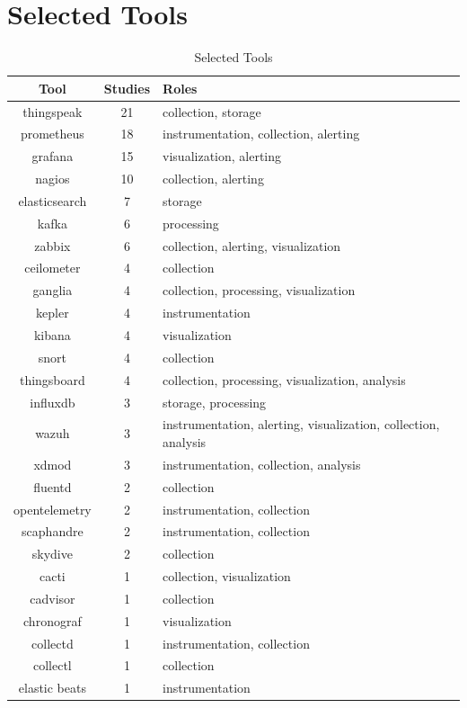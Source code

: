 \documentclass[sigconf]{acmart}
\begin{document}
\section{Selected Tools}
\begin{table}[!htbp]
  \caption{Selected Tools}
  \label{table-selected-tools}
  \small
  \begin{tabular}{c c p{4.5cm}}
  \hline
  \textbf{Tool} & \textbf{Studies} & \textbf{Roles} \\
  \hline
  thingspeak & 21 & collection, storage \\
  prometheus & 18 & instrumentation, collection, alerting \\
  grafana & 15 & visualization, alerting \\
  nagios & 10 & collection, alerting \\
  elasticsearch & 7 & storage \\
  kafka & 6 & processing \\
  zabbix & 6 & collection, alerting, visualization \\
  ceilometer & 4 & collection \\
  ganglia & 4 & collection, processing, visualization \\
  kepler & 4 & instrumentation \\
  kibana & 4 & visualization \\
  snort & 4 & collection \\
  thingsboard & 4 & collection, processing, visualization, analysis \\
  influxdb & 3 & storage, processing \\
  wazuh & 3 & instrumentation, alerting, visualization, collection,
  analysis \\
  xdmod & 3 & instrumentation, collection, analysis \\
  fluentd & 2 & collection \\
  opentelemetry & 2 & instrumentation, collection \\
  scaphandre & 2 & instrumentation, collection \\
  skydive & 2 & collection \\
  cacti & 1 & collection, visualization \\
  cadvisor & 1 & collection \\
  chronograf & 1 & visualization \\
  collectd & 1 & instrumentation, collection \\
  collectl & 1 & collection \\
  elastic beats & 1 & instrumentation \\

\end{tabular}
\end{table}
\end{document}
